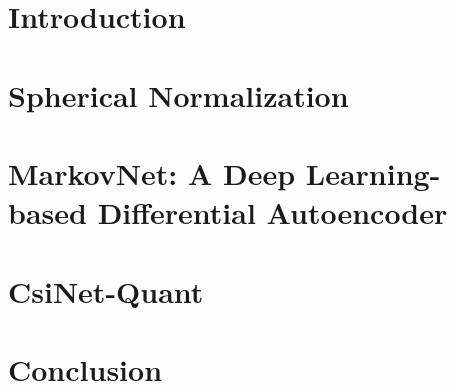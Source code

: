 \documentclass[12pt]{article}
\title{}
\author{
	\authorName\\
	\authorDepartment\\
	\authorAddress \\ %
	\authorEmail \\
}
\date{\today}
\begin{document}
	


\newpage
\tableofcontents

\newpage

\section{Introduction}


\section{Spherical Normalization}
\label{chap:sph_norm}


\section{MarkovNet: A Deep Learning-based Differential Autoencoder}
\label{chap:markovnet}


\section{CsiNet-Quant}
\label{chap:csinet_quant}


\section{Conclusion}


\newpage
\small


\end{document}

